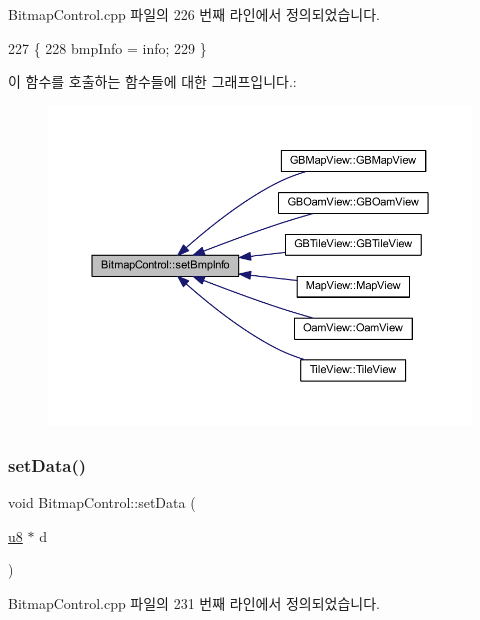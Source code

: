 Bitmap\+Control.\+cpp 파일의 226 번째 라인에서 정의되었습니다.


\begin{DoxyCode}
227 \{
228   bmpInfo = info;
229 \}
\end{DoxyCode}
이 함수를 호출하는 함수들에 대한 그래프입니다.\+:
\nopagebreak
\begin{figure}[H]
\begin{center}
\leavevmode
\includegraphics[width=350pt]{class_bitmap_control_a301c52fc62de4368fccdcdc93cefad0b_icgraph}
\end{center}
\end{figure}
\mbox{\label{class_bitmap_control_aa6206183896caf192a37709fa5d7b8d2}} 
\subsubsection{\texorpdfstring{set\+Data()}{setData()}}
{\footnotesize\ttfamily void Bitmap\+Control\+::set\+Data (\begin{DoxyParamCaption}\item[{\mbox{\hyperlink{_system_8h_aed742c436da53c1080638ce6ef7d13de}{u8}} $\ast$}]{d }\end{DoxyParamCaption})}



Bitmap\+Control.\+cpp 파일의 231 번째 라인에서 정의되었습니다.


